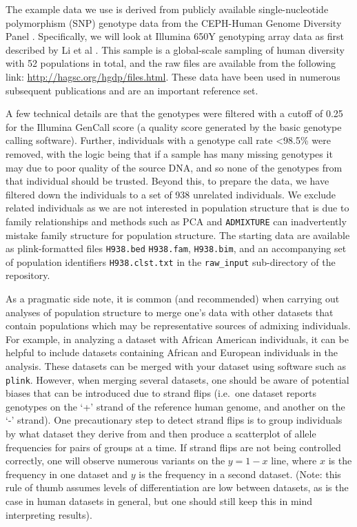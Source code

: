 \documentclass{svmult}       %
\begin{document}
The example data we use is derived from publicly available
single-nucleotide polymorphism (SNP) genotype data from the CEPH-Human
Genome Diversity Panel \cite{Cann02}. Specifically, we will look at
Illumina 650Y genotyping array data as first described by Li et al \cite{Li08}.
This sample is a global-scale sampling of human diversity
with 52 populations in total, and the raw files are available from the
following link: \url{http://hagsc.org/hgdp/files.html}. These data have
been used in numerous subsequent publications and are an important
reference set.

A few technical details are that the genotypes were filtered with a
cutoff of 0.25 for the Illumina GenCall score \cite{GenCall} (a quality
score generated by the basic genotype calling software). Further,
individuals with a genotype call rate \textless{}98.5\% were removed,
with the logic being that if a sample has many missing genotypes it may
due to poor quality of the source DNA, and so none of the genotypes from
that individual should be trusted. Beyond this, to prepare the data, we
have filtered down the individuals to a set of 938 unrelated
individuals. We exclude related individuals as we are not interested in
population structure that is due to family relationships and methods
such as PCA and \texttt{ADMIXTURE} can inadvertently mistake family
structure for population structure. The starting data are available as
plink-formatted files \texttt{H938.bed} \texttt{H938.fam},
\texttt{H938.bim}, and an accompanying set of population identifiers
\texttt{H938.clst.txt} in the \texttt{raw\_input} sub-directory of the
repository.

As a pragmatic side note, it is common (and recommended) when carrying
out analyses of population structure to merge one's data with other
datasets that contain populations which may be representative sources of
admixing individuals. For example, in analyzing a dataset with African
American individuals, it can be helpful to include datasets containing
African and European individuals in the analysis. These datasets can be
merged with your dataset using software such as \texttt{plink}. However,
when merging several datasets, one should be aware of potential biases
that can be introduced due to strand flips (i.e.~one dataset reports
genotypes on the `+' strand of the reference human genome, and another
on the `-' strand). One precautionary step to detect strand flips is to
group individuals by what dataset they derive from and then produce a
scatterplot of allele frequencies for pairs of groups at a time. If
strand flips are not being controlled correctly, one will observe
numerous variants on the \(y=1-x\) line, where \(x\) is the frequency in
one dataset and \(y\) is the frequency in a second dataset. (Note: this
rule of thumb assumes levels of differentiation are low between
datasets, as is the case in human datasets in general, but one should
still keep this in mind interpreting results).
\end{document}
